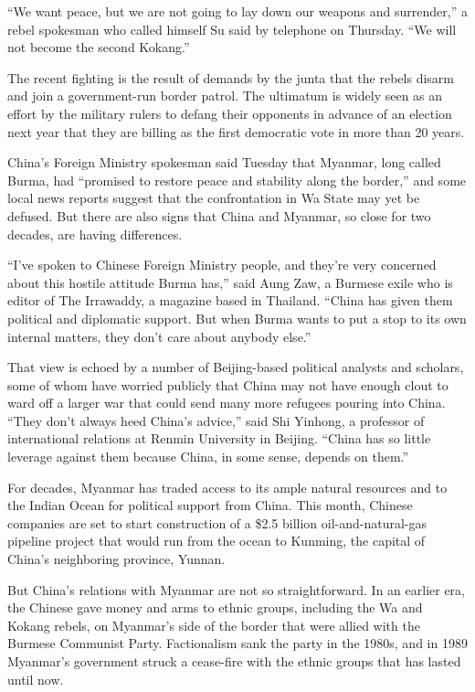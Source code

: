 ﻿\documentclass[12pt]{article}
\begin{document}
``We want peace, but we are not going to lay down our weapons and surrender,'' a rebel spokesman who
called himself Su said by telephone on Thursday. ``We will not become the second Kokang.''

The recent fighting is the result of demands by the junta that the rebels disarm and join a
government-run border patrol. The ultimatum is widely seen as an effort by the military rulers to
defang their opponents in advance of an election next year that they are billing as the first
democratic vote in more than 20 years.

China's Foreign Ministry spokesman said Tuesday that Myanmar, long called Burma, had ``promised to
restore peace and stability along the border,'' and some local news reports suggest that the
confrontation in Wa State may yet be defused. But there are also signs that China and Myanmar, so
close for two decades, are having differences.

``I've spoken to Chinese Foreign Ministry people, and they're very concerned about this hostile
attitude Burma has,'' said Aung Zaw, a Burmese exile who is editor of The Irrawaddy, a magazine
based in Thailand. ``China has given them political and diplomatic support. But when Burma wants to
put a stop to its own internal matters, they don't care about anybody else.''

That view is echoed by a number of Beijing-based political analysts and scholars, some of whom have
worried publicly that China may not have enough clout to ward off a larger war that could send many
more refugees pouring into China. ``They don't always heed China's advice,'' said Shi Yinhong, a
professor of international relations at Renmin University in Beijing. ``China has so little
leverage\cite{leverage} against them because China, in some sense, depends on them.''

For decades, Myanmar has traded access to its ample\cite{ample} natural resources and to the Indian
Ocean for political support from China. This month, Chinese companies are set to start construction
of a \$2.5 billion oil-and-natural-gas pipeline project that would run from the ocean to Kunming,
the capital of China's neighboring province, Yunnan.

But China's relations with Myanmar are not so straightforward. In an earlier era, the Chinese gave
money and arms to ethnic groups, including the Wa and Kokang rebels, on Myanmar's side of the border
that were allied with the Burmese Communist Party. Factionalism sank the party in the 1980s, and in
1989 Myanmar's government struck a cease-fire with the ethnic groups that has lasted until now.
\end{document}
